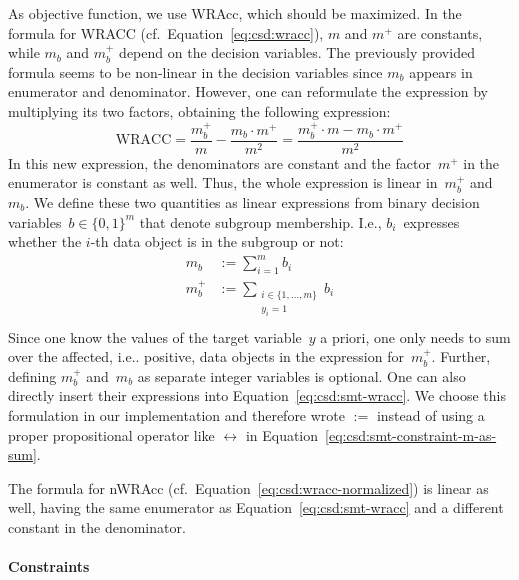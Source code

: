 \documentclass{article}
\theoremstyle{definition}
\begin{document}
As objective function, we use WRAcc, which should be maximized.
In the formula for WRACC (cf.~Equation~\ref{eq:csd:wracc}), $m$ and $m^+$ are constants, while $m_b$ and $m_b^+$ depend on the decision variables.
The previously provided formula seems to be non-linear in the decision variables since $m_b$ appears in enumerator and denominator.
However, one can reformulate the expression by multiplying its two factors, obtaining the following expression:
%
\begin{equation}
	\text{WRACC} = \frac{m_b^+}{m} - \frac{m_b \cdot m^+}{m^2} = \frac{m_b^+ \cdot m - m_b \cdot m^+}{m^2}
	\label{eq:csd:smt-wracc}
\end{equation}
%
In this new expression, the denominators are constant and the factor~$m^+$ in the enumerator is constant as well.
Thus, the whole expression is linear in~$m_b^+$ and~$m_b$.
We define these two quantities as linear expressions from binary decision variables~$b \in \{0, 1\}^m$ that denote subgroup membership.
I.e., $b_i$~expresses whether the $i$-th data object is in the subgroup or not:
%
\begin{equation}
	\begin{aligned}
		 m_b &:= \sum_{i=1}^{m} b_i \\
		 m_b^+ &:= \sum_{\substack{i \in \{1, \dots, m\} \\ y_i = 1 }} b_i \\
	\end{aligned}
	\label{eq:csd:smt-constraint-m-as-sum}
\end{equation}
%
Since one know the values of the target variable~$y$ a priori, one only needs to sum over the affected, i.e.. positive, data objects in the expression for~$m_b^+$.
Further, defining $m_b^+$ and~$m_b$ as separate integer variables is optional.
One can also directly insert their expressions into Equation~\ref{eq:csd:smt-wracc}.
We choose this formulation in our implementation and therefore wrote $:=$ instead of using a proper propositional operator like $\leftrightarrow$ in Equation~\ref{eq:csd:smt-constraint-m-as-sum}.

The formula for nWRAcc (cf.~Equation~\ref{eq:csd:wracc-normalized}) is linear as well, having the same enumerator as Equation~\ref{eq:csd:smt-wracc} and a different constant in the denominator.

\paragraph{Constraints}
\end{document}
